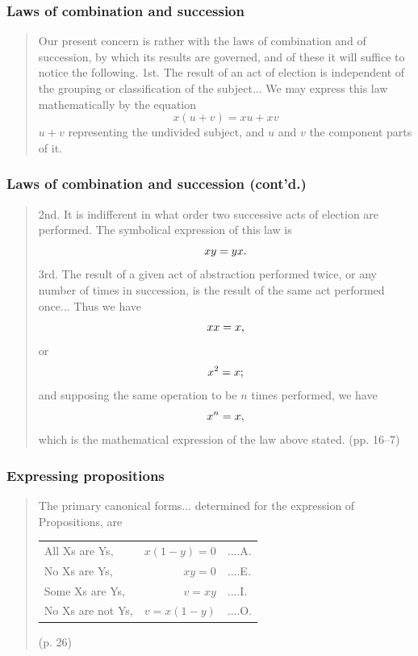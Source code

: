 \documentclass[compress,12pt]{beamer}
\begin{document}
\begin{frame}
    \frametitle{Laws of combination and succession}
    \begin{quote}
        Our present
        concern is rather with the laws of combination and of succession,
        by which its results are governed, and of these it will suffice to
        notice the following.
        1st. The result of an act of election is independent of the
        grouping or classification of the subject...
        We may express this law mathematically by the equation
        $$x(u+v)=xu+xv$$
        $u + v$ representing the undivided subject, and $u$ and $v$ the
        component parts of it.
    \end{quote}
\end{frame}

\begin{frame}
    \frametitle{Laws of combination and succession (cont'd.)}
    \begin{quote}{\setlength{\abovedisplayskip}{0pt}
        \setlength{\belowdisplayskip}{0pt}
        2nd. It is indifferent in what order two successive acts of
        election are performed.
        The symbolical expression of this law is $$xy=yx\textup{.}$$
        3rd. The result of a given act of abstraction performed twice,
        or any number of times in succession, is the result of the same
        act performed once...
        Thus we have $$xx=x\textup{,}$$
        or \vspace{-5mm}$$x^2=x\textup{;}$$
        and supposing the same operation to be $n$ times performed, we have $$x^n=x\textup{,}$$ which is the mathematical expression of the law above stated. (pp. 16--7)}
    \end{quote}
\end{frame}

\begin{frame}
    \frametitle{Expressing propositions}
    \begin{quote}
        The primary canonical forms... determined for the
        expression of Propositions, are
        \begin{center}
        \begin{tabular}{l r l}
            All Xs are Ys, & $x(1-y)=0$ & ....A.\\
            No Xs are Ys, & $xy=0$ & ....E.\\
            Some Xs are Ys, & $v=xy$ & ....I.\\
            No Xs are not Ys, & $v=x(1-y)$ & ....O.
        \end{tabular}
      \end{center}

        (p. 26)
    \end{quote}
\end{frame}
\end{document}
